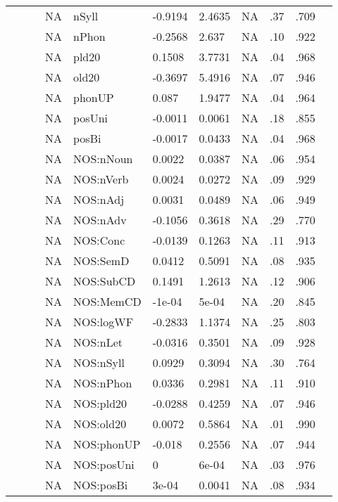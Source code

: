 \begin{table}[ht]
\begin{tabular}{lllllllllll}
   &  &  & NA & nSyll & -0.9194 & 2.4635 & NA & .37 & .709 &   \\ 
   &  &  & NA & nPhon & -0.2568 & 2.637 & NA & .10 & .922 &   \\ 
   &  &  & NA & pld20 & 0.1508 & 3.7731 & NA & .04 & .968 &   \\ 
   &  &  & NA & old20 & -0.3697 & 5.4916 & NA & .07 & .946 &   \\ 
   &  &  & NA & phonUP & 0.087 & 1.9477 & NA & .04 & .964 &   \\ 
   &  &  & NA & posUni & -0.0011 & 0.0061 & NA & .18 & .855 &   \\ 
   &  &  & NA & posBi & -0.0017 & 0.0433 & NA & .04 & .968 &   \\ 
   &  &  & NA & NOS:nNoun & 0.0022 & 0.0387 & NA & .06 & .954 &   \\ 
   &  &  & NA & NOS:nVerb & 0.0024 & 0.0272 & NA & .09 & .929 &   \\ 
   &  &  & NA & NOS:nAdj & 0.0031 & 0.0489 & NA & .06 & .949 &   \\ 
   &  &  & NA & NOS:nAdv & -0.1056 & 0.3618 & NA & .29 & .770 &   \\ 
   &  &  & NA & NOS:Conc & -0.0139 & 0.1263 & NA & .11 & .913 &   \\ 
   &  &  & NA & NOS:SemD & 0.0412 & 0.5091 & NA & .08 & .935 &   \\ 
   &  &  & NA & NOS:SubCD & 0.1491 & 1.2613 & NA & .12 & .906 &   \\ 
   &  &  & NA & NOS:MemCD & -1e-04 & 5e-04 & NA & .20 & .845 &   \\ 
   &  &  & NA & NOS:logWF & -0.2833 & 1.1374 & NA & .25 & .803 &   \\ 
   &  &  & NA & NOS:nLet & -0.0316 & 0.3501 & NA & .09 & .928 &   \\ 
   &  &  & NA & NOS:nSyll & 0.0929 & 0.3094 & NA & .30 & .764 &   \\ 
   &  &  & NA & NOS:nPhon & 0.0336 & 0.2981 & NA & .11 & .910 &   \\ 
   &  &  & NA & NOS:pld20 & -0.0288 & 0.4259 & NA & .07 & .946 &   \\ 
   &  &  & NA & NOS:old20 & 0.0072 & 0.5864 & NA & .01 & .990 &   \\ 
   &  &  & NA & NOS:phonUP & -0.018 & 0.2556 & NA & .07 & .944 &   \\ 
   &  &  & NA & NOS:posUni & 0 & 6e-04 & NA & .03 & .976 &   \\ 
   &  &  & NA & NOS:posBi & 3e-04 & 0.0041 & NA & .08 & .934 &   \\ 

\end{tabular}
\end{table}
